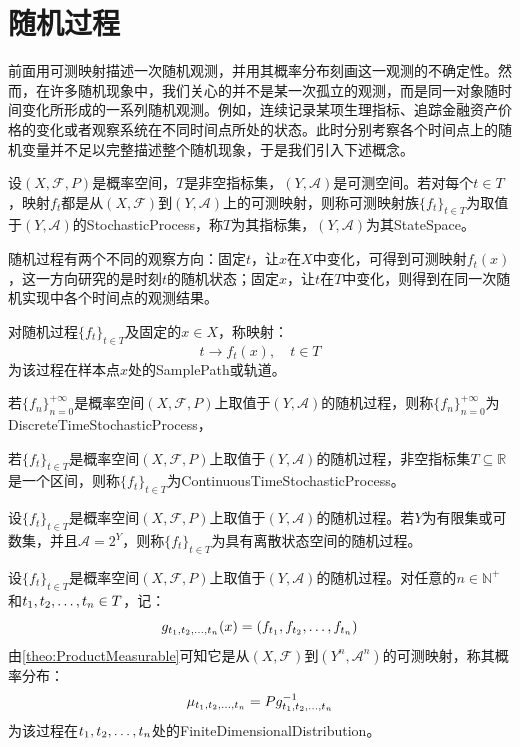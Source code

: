 \section{随机过程}

前面用可测映射描述一次随机观测，并用其概率分布刻画这一观测的不确定性。然而，在许多随机现象中，我们关心的并不是某一次孤立的观测，而是同一对象随时间变化所形成的一系列随机观测。例如，连续记录某项生理指标、追踪金融资产价格的变化或者观察系统在不同时间点所处的状态。此时分别考察各个时间点上的随机变量并不足以完整描述整个随机现象，于是我们引入下述概念。
\begin{definition}
	设$(X,\mathscr{F},P)$是概率空间，$T$是非空指标集，$(Y,\mathscr{A})$是可测空间。若对每个$t\in T$，映射$f_t$都是从$(X,\mathscr{F})$到$(Y,\mathscr{A})$上的可测映射，则称可测映射族$\{f_t\}_{t\in T}$为取值于$(Y,\mathscr{A})$的\gls{StochasticProcess}，称$T$为其指标集，$(Y,\mathscr{A})$为其\gls{StateSpace}。
\end{definition}
随机过程有两个不同的观察方向：固定$t$，让$x$在$X$中变化，可得到可测映射$f_t(x)$，这一方向研究的是时刻$t$的随机状态；固定$x$，让$t$在$T$中变化，则得到在同一次随机实现中各个时间点的观测结果。
\begin{definition}
	对随机过程$\{f_t\}_{t\in T}$及固定的$x\in X$，称映射：
	\begin{equation*}
		t\to f_t(x),\quad t\in T
	\end{equation*}
	为该过程在样本点$x$处的\gls{SamplePath}或轨道。
\end{definition}
\begin{definition}
	若$\{f_n\}_{n=0}^{+\infty}$是概率空间$(X,\mathscr{F},P)$上取值于$(Y,\mathscr{A})$的随机过程，则称$\{f_n\}_{n=0}^{+\infty}$为\gls{DiscreteTimeStochasticProcess}，
\end{definition}
\begin{definition}
	若$\{f_t\}_{t\in T}$是概率空间$(X,\mathscr{F},P)$上取值于$(Y,\mathscr{A})$的随机过程，非空指标集$T\subseteq\mathbb{R}$是一个区间，则称$\{f_t\}_{t\in T}$为\gls{ContinuousTimeStochasticProcess}。
\end{definition}
\begin{definition}
	设$\{f_t\}_{t\in T}$是概率空间$(X,\mathscr{F},P)$上取值于$(Y,\mathscr{A})$的随机过程。若$Y$为有限集或可数集，并且$\mathscr{A}=2^Y$，则称$\{f_t\}_{t\in T}$为具有离散状态空间的随机过程。
\end{definition}
\begin{definition}
	设$\{f_t\}_{t\in T}$是概率空间$(X,\mathscr{F},P)$上取值于$(Y,\mathscr{A})$的随机过程。对任意的$n\in\mathbb{N}^+$和$t_1, t_2, \dots, t_{n}\in T$，记：
	\begin{equation*}
		g_{t_1, t_2, \dots, t_{n}}(x)=(f_{t_1},f_{t_2},\dots,f_{t_n})
	\end{equation*}
	由\cref{theo:ProductMeasurable}可知它是从$(X,\mathscr{F})$到$(Y^n,\mathscr{A}^n)$的可测映射，称其概率分布：
	\begin{equation*}
		\mu_{t_1, t_2, \dots, t_{n}}=Pg_{t_1, t_2, \dots, t_{n}}^{-1}
	\end{equation*}
	为该过程在$t_1, t_2, \dots, t_{n}$处的\gls{FiniteDimensionalDistribution}。
\end{definition}
